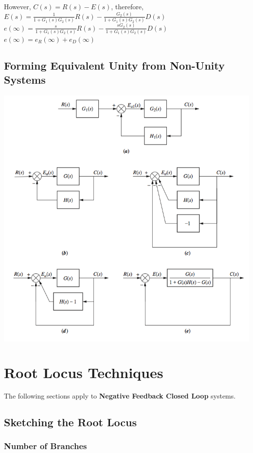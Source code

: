 \documentclass[11pt]{article}
\begin{document}
    However, $C(s) = R(s) - E(s)$, therefore, \\
    
    $E(s) = \frac{1}{1 + G_1(s)G_2(s)}R(s) - \frac{G_2(s)}{1+G_1(s)G_2(s)}D(s)$ \\
    
    $e(\infty) = \frac{s}{1 + G_1(s)G_2(s)}R(s) - \frac{sG_2(s)}{1+G_1(s)G_2(s)}D(s)$ \\ 

    $e(\infty) = e_R(\infty) + e_D(\infty)$


   \subsection{Forming Equivalent Unity from Non-Unity Systems}

   \begin{center}
    \includegraphics[width=300 px]{img/nonunity} \\
    \end{center}

    \pagebreak


    \section{Root Locus Techniques}

    The following sections apply to \textbf{Negative Feedback Closed Loop} systems.

    \subsection{Sketching the Root Locus}

    \subsubsection{Number of Branches}
\end{document}
